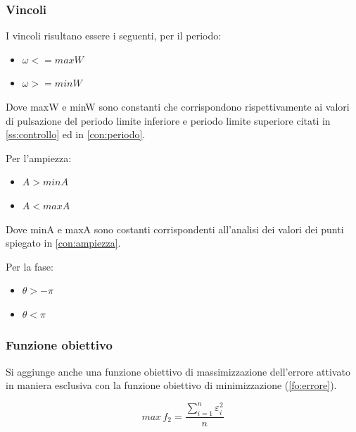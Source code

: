 \documentclass[a4paper,12pt]{report}
\begin{document}
\subsubsection{Vincoli}
I vincoli risultano essere i seguenti, per il periodo:
\begin{itemize}
  \item $\omega <= maxW$
  \item $\omega >= minW$
\end{itemize}
Dove maxW e minW sono constanti che corrispondono rispettivamente ai valori di pulsazione del periodo limite inferiore e periodo limite superiore citati in \ref{ss:controllo} ed in \ref{con:periodo}.

Per l'ampiezza:

\begin{itemize}
  \item $A > minA$
  \item $A < maxA$
\end{itemize}
Dove minA e maxA sono costanti corrispondenti all'analisi dei valori dei punti spiegato in \ref{con:ampiezza}.

Per la fase:

\begin{itemize}
  \item $\theta > -\pi$
  \item $\theta < \pi$
\end{itemize}

\subsubsection{Funzione obiettivo}

Si aggiunge anche una funzione obiettivo di massimizzazione dell'errore attivato in maniera esclusiva con la funzione obiettivo di minimizzazione (\ref{fo:errore}).

\begin{equation}
\label{fo:maxerrore}
max \, f_2 = \frac{\sum_{i=1}^n \varepsilon_i^2}{n}
\end{equation}
\end{document}
